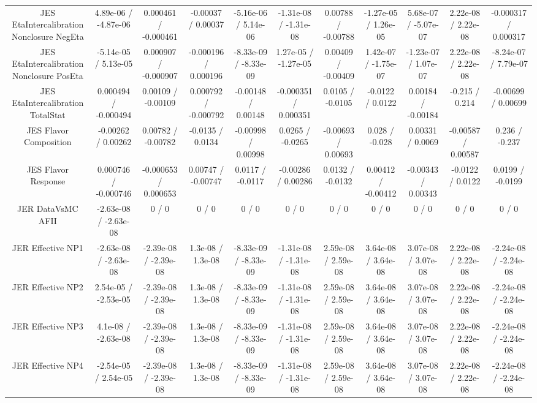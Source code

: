 \begin{table}[htbp]
\begin{center}
\begin{tabular}{|c|c|c|c|c|c|c|c|c|c|c|}
  JES EtaIntercalibration Nonclosure NegEta & 4.89e-06 / -4.87e-06 & 0.000461 / -0.000461 & -0.00037 / 0.00037 & -5.16e-06 / 5.14e-06 & -1.31e-08 / -1.31e-08 & 0.00788 / -0.00788 & -1.27e-05 / 1.26e-05 & 5.68e-07 / -5.07e-07 & 2.22e-08 / 2.22e-08 & -0.000317 / 0.000317 \\ 
  JES EtaIntercalibration Nonclosure PosEta & -5.14e-05 / 5.13e-05 & 0.000907 / -0.000907 & -0.000196 / 0.000196 & -8.33e-09 / -8.33e-09 & 1.27e-05 / -1.27e-05 & 0.00409 / -0.00409 & 1.42e-07 / -1.75e-07 & -1.23e-07 / 1.07e-07 & 2.22e-08 / 2.22e-08 & -8.24e-07 / 7.79e-07 \\ 
  JES EtaIntercalibration TotalStat & 0.000494 / -0.000494 & 0.00109 / -0.00109 & 0.000792 / -0.000792 & -0.00148 / 0.00148 & -0.000351 / 0.000351 & 0.0105 / -0.0105 & -0.0122 / 0.0122 & 0.00184 / -0.00184 & -0.215 / 0.214 & -0.00699 / 0.00699 \\ 
  JES Flavor Composition & -0.00262 / 0.00262 & 0.00782 / -0.00782 & -0.0135 / 0.0134 & -0.00998 / 0.00998 & 0.0265 / -0.0265 & -0.00693 / 0.00693 & 0.028 / -0.028 & 0.00331 / 0.0069 & -0.00587 / 0.00587 & 0.236 / -0.237 \\ 
  JES Flavor Response & 0.000746 / -0.000746 & -0.000653 / 0.000653 & 0.00747 / -0.00747 & 0.0117 / -0.0117 & -0.00286 / 0.00286 & 0.0132 / -0.0132 & 0.00412 / -0.00412 & -0.00343 / 0.00343 & -0.0122 / 0.0122 & 0.0199 / -0.0199 \\ 
  JER DataVsMC AFII & -2.63e-08 / -2.63e-08 & 0 / 0 & 0 / 0 & 0 / 0 & 0 / 0 & 0 / 0 & 0 / 0 & 0 / 0 & 0 / 0 & 0 / 0 \\ 
  JER Effective NP1 & -2.63e-08 / -2.63e-08 & -2.39e-08 / -2.39e-08 & 1.3e-08 / 1.3e-08 & -8.33e-09 / -8.33e-09 & -1.31e-08 / -1.31e-08 & 2.59e-08 / 2.59e-08 & 3.64e-08 / 3.64e-08 & 3.07e-08 / 3.07e-08 & 2.22e-08 / 2.22e-08 & -2.24e-08 / -2.24e-08 \\ 
  JER Effective NP2 & 2.54e-05 / -2.53e-05 & -2.39e-08 / -2.39e-08 & 1.3e-08 / 1.3e-08 & -8.33e-09 / -8.33e-09 & -1.31e-08 / -1.31e-08 & 2.59e-08 / 2.59e-08 & 3.64e-08 / 3.64e-08 & 3.07e-08 / 3.07e-08 & 2.22e-08 / 2.22e-08 & -2.24e-08 / -2.24e-08 \\ 
  JER Effective NP3 & 4.1e-08 / -2.63e-08 & -2.39e-08 / -2.39e-08 & 1.3e-08 / 1.3e-08 & -8.33e-09 / -8.33e-09 & -1.31e-08 / -1.31e-08 & 2.59e-08 / 2.59e-08 & 3.64e-08 / 3.64e-08 & 3.07e-08 / 3.07e-08 & 2.22e-08 / 2.22e-08 & -2.24e-08 / -2.24e-08 \\ 
  JER Effective NP4 & -2.54e-05 / 2.54e-05 & -2.39e-08 / -2.39e-08 & 1.3e-08 / 1.3e-08 & -8.33e-09 / -8.33e-09 & -1.31e-08 / -1.31e-08 & 2.59e-08 / 2.59e-08 & 3.64e-08 / 3.64e-08 & 3.07e-08 / 3.07e-08 & 2.22e-08 / 2.22e-08 & -2.24e-08 / -2.24e-08 \\ 

\end{tabular}
\end{center}
\end{table}
